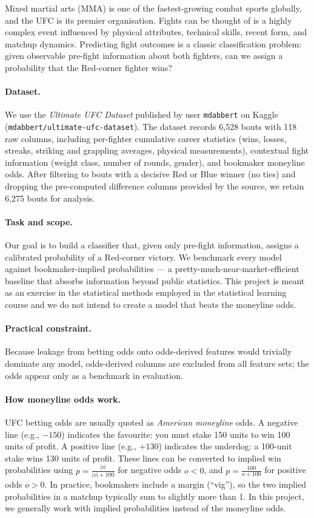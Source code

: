 \documentclass{article}
\begin{document}
Mixed martial arts (MMA) is one of the fastest-growing combat sports
globally, and the UFC is its premier organisation.
Fights can be thought of is a highly complex event influenced by physical attributes,
technical skills, recent form, and matchup dynamics.
Predicting fight outcomes is a classic classification problem: given
observable pre-fight information about both fighters, can we assign a
probability that the Red-corner fighter wins?

\paragraph{Dataset.}
We use the \emph{Ultimate UFC Dataset} published by user \texttt{mdabbert}
on Kaggle (\texttt{mdabbert/ultimate-ufc-dataset}).
The dataset records 6{,}528 bouts with 118 raw columns, including
per-fighter cumulative career statistics (wins, losses, streaks, striking
and grappling averages, physical measurements), contextual fight information
(weight class, number of rounds, gender), and bookmaker moneyline odds.
After filtering to bouts with a decisive Red or Blue winner (no ties) and dropping
the pre-computed difference columns provided by the source, we retain 6{,}275
bouts for analysis.

\paragraph{Task and scope.}
Our goal is to build a classifier that, given only pre-fight information,
assigns a calibrated probability of a Red-corner victory.
We benchmark every model against bookmaker-implied probabilities --- a
pretty-much-near-market-efficient baseline that absorbs information beyond public
statistics.
This project is meant as an exercise in the statistical methods employed in the
statistical learning course and we do not intend to create a model that beats 
the moneyline odds. 

\paragraph{Practical constraint.}
Because leakage from betting odds onto odds-derived features would trivially dominate any model, 
odds-derived columns are excluded from all feature sets; the odds appear only as a
benchmark in evaluation.

\paragraph{How moneyline odds work.}
UFC betting odds are usually quoted as \emph{American moneyline} odds.
A negative line (e.g., $-150$) indicates the favourite: you must stake 150
units to win 100 units of profit.
A positive line (e.g., $+130$) indicates the underdog: a 100-unit stake wins
130 units of profit.
These lines can be converted to implied win probabilities using
$p = \frac{|o|}{|o| + 100}$ for negative odds $o < 0$, and
$p = \frac{100}{o + 100}$ for positive odds $o > 0$.
In practice, bookmakers include a margin (``vig''), so the two implied
probabilities in a matchup typically sum to slightly more than 1.
In this project, we generally work with implied probabilities instead of the 
moneyline odds.
\end{document}
